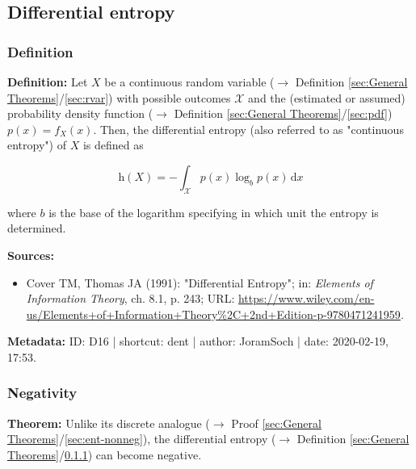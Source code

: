 \documentclass[a4paper,12pt,twoside]{book}
\begin{document}
\subsection{Differential entropy}

\subsubsection[\textit{Definition}]{Definition} \label{sec:dent}
\setcounter{equation}{0}

\textbf{Definition:} Let $X$ be a continuous random variable ($\rightarrow$ Definition \ref{sec:General Theorems}/\ref{sec:rvar}) with possible outcomes $\mathcal{X}$ and the (estimated or assumed) probability density function ($\rightarrow$ Definition \ref{sec:General Theorems}/\ref{sec:pdf}) $p(x) = f_X(x)$. Then, the differential entropy (also referred to as "continuous entropy") of $X$ is defined as

\begin{equation} \label{eq:dent-dent}
\mathrm{h}(X) = - \int_{\mathcal{X}} p(x) \log_b p(x) \, \mathrm{d}x
\end{equation}

where $b$ is the base of the logarithm specifying in which unit the entropy is determined.


\vspace{1em}
\textbf{Sources:}
\begin{itemize}
\item Cover TM, Thomas JA (1991): "Differential Entropy"; in: \textit{Elements of Information Theory}, ch. 8.1, p. 243; URL: \url{https://www.wiley.com/en-us/Elements+of+Information+Theory%2C+2nd+Edition-p-9780471241959}.
\end{itemize}


\vspace{1em}
\textbf{Metadata:} ID: D16 | shortcut: dent | author: JoramSoch | date: 2020-02-19, 17:53.
\vspace{1em}



\subsubsection[\textbf{Negativity}]{Negativity} \label{sec:dent-neg}
\setcounter{equation}{0}

\textbf{Theorem:} Unlike its discrete analogue ($\rightarrow$ Proof \ref{sec:General Theorems}/\ref{sec:ent-nonneg}), the differential entropy ($\rightarrow$ Definition \ref{sec:General Theorems}/\ref{sec:dent}) can become negative.
\end{document}
